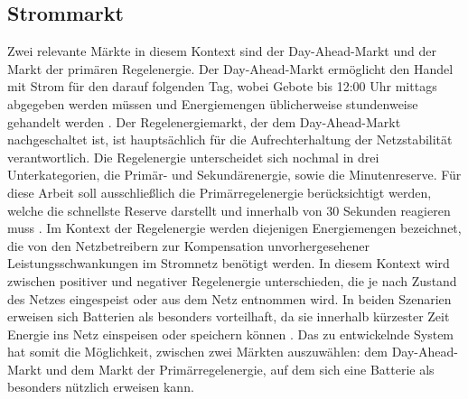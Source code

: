 \documentclass[a4paper, 11pt]{article}
\begin{document}
\subsection{Strommarkt}
Zwei relevante Märkte in diesem Kontext sind der Day-Ahead-Markt und der Markt der primären Regelenergie. Der Day-Ahead-Markt ermöglicht den Handel mit Strom für den darauf folgenden Tag, wobei Gebote bis 12:00 Uhr mittags abgegeben werden müssen und Energiemengen üblicherweise stundenweise gehandelt werden \cite{noauthor_day-ahead-handel_nodate}. Der Regelenergiemarkt, der dem Day-Ahead-Markt nachgeschaltet ist, ist hauptsächlich für die Aufrechterhaltung der Netzstabilität verantwortlich. Die Regelenergie unterscheidet sich nochmal in drei Unterkategorien, die Primär- und Sekundärenergie, sowie die Minutenreserve. Für diese Arbeit soll ausschließlich die Primärregelenergie berücksichtigt werden, welche die schnellste Reserve darstellt und innerhalb von 30 Sekunden reagieren muss \cite{noauthor_bundesnetzagentur_nodate-1}.
Im Kontext der Regelenergie werden diejenigen Energiemengen bezeichnet, die von den Netzbetreibern zur Kompensation unvorhergesehener Leistungsschwankungen im Stromnetz benötigt werden. In diesem Kontext wird zwischen positiver und negativer Regelenergie unterschieden, die je nach Zustand des Netzes eingespeist oder aus dem Netz entnommen wird. In beiden Szenarien erweisen sich Batterien als besonders vorteilhaft, da sie innerhalb kürzester Zeit Energie ins Netz einspeisen oder speichern können \cite{denholm_role_2010}.
Das zu entwickelnde System hat somit die Möglichkeit, zwischen zwei Märkten auszuwählen: dem Day-Ahead-Markt und dem Markt der Primärregelenergie, auf dem sich eine Batterie als besonders nützlich erweisen kann.
\end{document}
